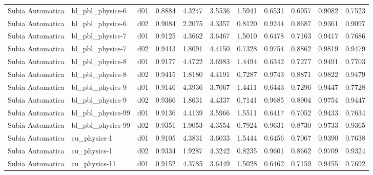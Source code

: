 \begin{longtable}{lllrrrrrrrr}
     Subia Automatica  &      bl\_pbl\_physics-6 &     d01 &   0.8884 &   4.3247 &   3.5536 &       1.5941 &        0.6531 &       0.6957 &           0.9082 &  0.7523 \\
     Subia Automatica  &      bl\_pbl\_physics-6 &     d02 &   0.9084 &   2.2075 &   4.3357 &       0.8120 &        0.9244 &       0.8687 &           0.9361 &  0.9097 \\
     Subia Automatica  &      bl\_pbl\_physics-7 &     d01 &   0.9125 &   4.3662 &   3.6467 &       1.5010 &        0.6478 &       0.7163 &           0.9417 &  0.7686 \\
     Subia Automatica  &      bl\_pbl\_physics-7 &     d02 &   0.9413 &   1.8091 &   4.4150 &       0.7328 &        0.9754 &       0.8862 &           0.9819 &  0.9479 \\
     Subia Automatica  &      bl\_pbl\_physics-8 &     d01 &   0.9177 &   4.4722 &   3.6983 &       1.4494 &        0.6342 &       0.7277 &           0.9491 &  0.7703 \\
     Subia Automatica  &      bl\_pbl\_physics-8 &     d02 &   0.9415 &   1.8180 &   4.4191 &       0.7287 &        0.9743 &       0.8871 &           0.9822 &  0.9479 \\
     Subia Automatica  &      bl\_pbl\_physics-9 &     d01 &   0.9146 &   4.3936 &   3.7067 &       1.4411 &        0.6443 &       0.7296 &           0.9447 &  0.7728 \\
     Subia Automatica  &      bl\_pbl\_physics-9 &     d02 &   0.9366 &   1.8631 &   4.4337 &       0.7141 &        0.9685 &       0.8904 &           0.9754 &  0.9447 \\
     Subia Automatica  &     bl\_pbl\_physics-99 &     d01 &   0.9136 &   4.4139 &   3.5966 &       1.5511 &        0.6417 &       0.7052 &           0.9433 &  0.7634 \\
     Subia Automatica  &     bl\_pbl\_physics-99 &     d02 &   0.9351 &   1.9053 &   4.3554 &       0.7924 &        0.9631 &       0.8730 &           0.9733 &  0.9365 \\
     Subia Automatica  &          cu\_physics-1 &     d01 &   0.9105 &   4.3831 &   3.6033 &       1.5444 &        0.6456 &       0.7067 &           0.9390 &  0.7638 \\
     Subia Automatica  &          cu\_physics-1 &     d02 &   0.9334 &   1.9287 &   4.3242 &       0.8235 &        0.9601 &       0.8662 &           0.9709 &  0.9324 \\
     Subia Automatica  &         cu\_physics-11 &     d01 &   0.9152 &   4.3785 &   3.6449 &       1.5028 &        0.6462 &       0.7159 &           0.9455 &  0.7692 \\

\end{longtable}
